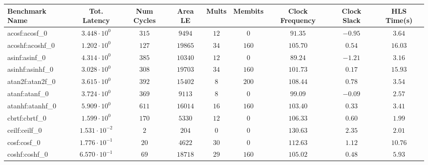 \begin{tabular}{|l|c|c|c|c|c|c|c|c|}
\hline
Benchmark Name               & Tot. Latency            & Num Cycles & Area LE    & Mults   & Membits  & Clock Frequency & Clock Slack & HLS Time(s) \\
\hline
acosf:acosf\_0               & $ 3.448 \cdot 10^{0}  $ & $ 315    $ & $ 9494   $ & $ 12  $ & $ 0    $ & $ 91.35       $ & $ -0.95   $ & $ 3.64    $ \\
acoshf:acoshf\_0             & $ 1.202 \cdot 10^{0}  $ & $ 127    $ & $ 19865  $ & $ 34  $ & $ 160  $ & $ 105.70      $ & $ 0.54    $ & $ 16.03   $ \\
asinf:asinf\_0               & $ 4.314 \cdot 10^{0}  $ & $ 385    $ & $ 10340  $ & $ 12  $ & $ 0    $ & $ 89.24       $ & $ -1.21   $ & $ 3.16    $ \\
asinhf:asinhf\_0             & $ 3.028 \cdot 10^{0}  $ & $ 308    $ & $ 19703  $ & $ 34  $ & $ 160  $ & $ 101.73      $ & $ 0.17    $ & $ 15.93   $ \\
atan2f:atan2f\_0             & $ 3.615 \cdot 10^{0}  $ & $ 392    $ & $ 15402  $ & $ 8   $ & $ 200  $ & $ 108.44      $ & $ 0.78    $ & $ 3.54    $ \\
atanf:atanf\_0               & $ 3.724 \cdot 10^{0}  $ & $ 369    $ & $ 9113   $ & $ 8   $ & $ 0    $ & $ 99.09       $ & $ -0.09   $ & $ 2.57    $ \\
atanhf:atanhf\_0             & $ 5.909 \cdot 10^{0}  $ & $ 611    $ & $ 16014  $ & $ 16  $ & $ 160  $ & $ 103.40      $ & $ 0.33    $ & $ 3.41    $ \\
cbrtf:cbrtf\_0               & $ 1.599 \cdot 10^{0}  $ & $ 170    $ & $ 5330   $ & $ 12  $ & $ 0    $ & $ 106.33      $ & $ 0.60    $ & $ 1.99    $ \\
ceilf:ceilf\_0               & $ 1.531 \cdot 10^{-2} $ & $ 2      $ & $ 204    $ & $ 0   $ & $ 0    $ & $ 130.63      $ & $ 2.35    $ & $ 2.01    $ \\
cosf:cosf\_0                 & $ 1.776 \cdot 10^{-1} $ & $ 20     $ & $ 4622   $ & $ 30  $ & $ 0    $ & $ 112.63      $ & $ 1.12    $ & $ 10.76   $ \\
coshf:coshf\_0               & $ 6.570 \cdot 10^{-1} $ & $ 69     $ & $ 18718  $ & $ 29  $ & $ 160  $ & $ 105.02      $ & $ 0.48    $ & $ 5.93    $ \\

\end{tabular}
